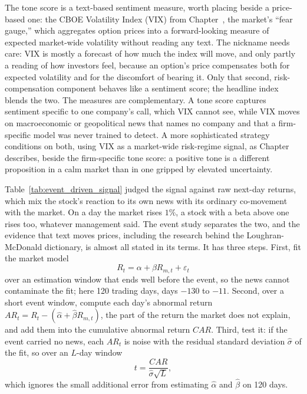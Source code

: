 \documentclass[../ai_in_finance]{subfiles}
\begin{document}
The tone score is a text-based sentiment measure, worth placing beside a price-based one: the CBOE Volatility Index (VIX) from Chapter~, the market's ``fear gauge,'' which aggregates option prices into a forward-looking measure of expected market-wide volatility without reading any text. The nickname needs care: VIX is mostly a forecast of how much the index will move, and only partly a reading of how investors feel, because an option's price compensates both for expected volatility and for the discomfort of bearing it. Only that second, risk-compensation component behaves like a sentiment score; the headline index blends the two. The measures are complementary. A tone score captures sentiment specific to one company's call, which VIX cannot see, while VIX moves on macroeconomic or geopolitical news that names no company and that a firm-specific model was never trained to detect. A more sophisticated strategy conditions on both, using VIX as a market-wide risk-regime signal, as Chapter~ describes, beside the firm-specific tone score: a positive tone is a different proposition in a calm market than in one gripped by elevated uncertainty.


Table~\ref{tab:event_driven_signal} judged the signal against raw next-day returns, which mix the stock's reaction to its own news with its ordinary co-movement with the market. On a day the market rises $1\%$, a stock with a beta above one rises too, whatever management said. The event study \parencite{campbell1997econometrics} separates the two, and the evidence that text moves prices, including the research behind the Loughran-McDonald dictionary, is almost all stated in its terms. It has three steps. First, fit the market model
\begin{equation*}
R_t = \alpha + \beta R_{m,t} + \varepsilon_t
\end{equation*}
over an estimation window that ends well before the event, so the news cannot contaminate the fit; here 120 trading days, days $-130$ to $-11$. Second, over a short event window, compute each day's abnormal return $AR_t = R_t - (\hat\alpha + \hat\beta R_{m,t})$, the part of the return the market does not explain, and add them into the cumulative abnormal return $CAR$. Third, test it: if the event carried no news, each $AR_t$ is noise with the residual standard deviation $\hat\sigma$ of the fit, so over an $L$-day window
\begin{equation}
t = \frac{CAR}{\hat\sigma\sqrt{L}},
\label{eq:nlp-car-t}
\end{equation}
which ignores the small additional error from estimating $\hat\alpha$ and $\hat\beta$ on 120 days.
\end{document}
